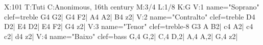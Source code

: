 X:101
T:Tuti
C:Anonimous, 16th century
M:3/4
L:1/8
K:G
V:1 name="Soprano" clef=treble
G4 G2| G4 F2| A4 A2| B4 z2|
V:2 name="Contralto" clef=treble
D4 D2| E4 D2| E4 F2| G4 z2|
V:3 name="Tenor" clef=treble-8
G3 A B2| c4 A2| c4 c2| d4 z2|
V:4 name="Baixo" clef=bass
G,4 G,2| C,4 D,2| A,4 A,2| G,4 z2|

